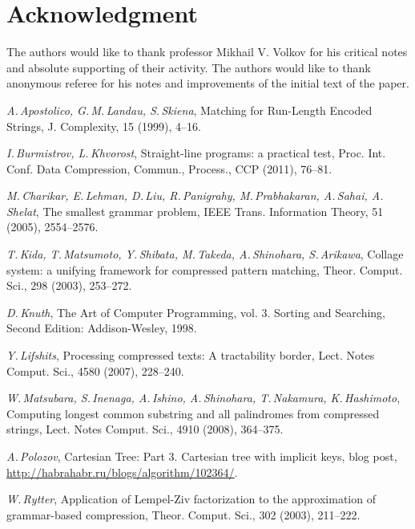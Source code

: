 ﻿\documentclass[11pt]{article}
\theoremstyle{remark}
\begin{document}
\section*{Acknowledgment}

The authors would like to thank professor Mikhail V. Volkov for his critical notes and absolute supporting of
their activity. The authors would like to thank anonymous referee for his notes and improvements of the initial text of
the paper.

\small

\begin{thebibliography}{99}
\textsl{A.\,Apostolico, G.\,M.\,Landau, S.\,Skiena}, Matching for Run-Length Encoded Strings, J. Complexity, 15 (1999),
4--16.

\textsl{I.\,Burmistrov, L.\,Khvorost}, Straight-line programs: a practical test, Proc. Int. Conf. Data Compression, Commun., Process., CCP
(2011), 76--81.

\textsl{M.\,Charikar, E.\,Lehman,  D.\,Liu, R.\,Panigrahy, M.\,Prabhakaran, A.\,Sahai, A.\,Shelat}, The smallest grammar problem, IEEE
Trans. Information Theory, 51 (2005), 2554--2576.

\textsl{T.\,Kida, T.\,Matsumoto, Y.\,Shibata, M.\,Takeda, A.\,Shinohara, S.\,Arikawa}, Collage system: a unifying
framework for compressed pattern matching, Theor. Comput. Sci., 298 (2003), 253--272.

\textsl{D.\,Knuth}, The Art of Computer Programming, vol. 3. Sorting and Searching, Second Edition: Addison-Wesley,
1998.

\textsl{Y.\,Lifshits}, Processing compressed texts: A tractability border, Lect. Notes Comput. Sci., 4580 (2007), 228--240.

\textsl{W.\,Matsubara, S.\,Inenaga, A.\,Ishino, A.\,Shinohara, T.\,Nakamura, K.\,Hashimoto}, Computing longest common
substring and all palindromes from compressed strings, Lect. Notes Comput. Sci., 4910 (2008), 364--375.

\textsl{A.\,Polozov}, Cartesian Tree: Part 3. Cartesian tree with implicit keys, blog post,
\url{http://habrahabr.ru/blogs/algorithm/102364/}.

\textsl{W.\,Rytter}, Application of {L}empel-{Z}iv factorization to the approximation of grammar-based compression,
Theor. Comput. Sci., 302 (2003), 211--222.


\end{thebibliography}
\end{document}
